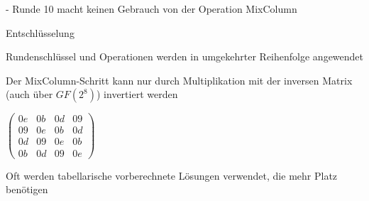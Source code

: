 \documentclass[a4paper]{article}
\begin{document}
\begin{multicols}{3}
\begin{itemize*}
\begin{description*}
                  \item[-] Runde 10 macht keinen Gebrauch von der Operation MixColumn
            \end{description*}
            \item Entschlüsselung
            \begin{itemize*}
                  \item Rundenschlüssel und Operationen werden in umgekehrter Reihenfolge angewendet
                  \item Der MixColumn-Schritt kann nur durch Multiplikation mit der inversen Matrix (auch über $GF(2^8)$) invertiert werden
                  \item $\begin{pmatrix} 0e&0b&0d&09\\ 09&0e&0b&0d\\ 0d&09&0e&0b\\ 0b&0d&09&0e \end{pmatrix}$
                  \item Oft werden tabellarische vorberechnete Lösungen verwendet, die mehr Platz benötigen
            \end{itemize*}
      \end{itemize*}


\end{multicols}
\end{document}

